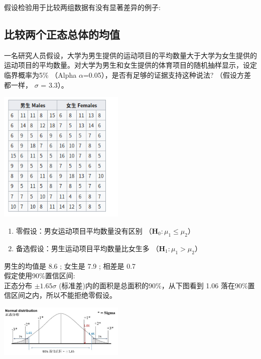 假设检验用于比较两组数据有没有显著差异的例子:

\hypertarget{ux6bd4ux8f83ux4e24ux4e2aux6b63ux6001ux603bux4f53ux7684ux5747ux503c}{%
\subsection{比较两个正态总体的均值}\label{ux6bd4ux8f83ux4e24ux4e2aux6b63ux6001ux603bux4f53ux7684ux5747ux503c}}

一名研究人员假设，大学为男生提供的运动项目的平均数量大于大学为女生提供的运动项目的平均数量。对大学为男生和女生提供的体育项目的随机抽样显示，设定临界概率为5\%
（Alpha \(\alpha\)=0.05），是否有足够的证据支持这种说法? （假设方差都一样，
\(\sigma\) = 3.3）。


\includegraphics[width=6cm]{Screenshotfrom2022-12-2822-35-57.png}


\begin{enumerate}
\tightlist
\item
  零假设：男女运动项目平均数量没有区别
  （\(\mathbf{H}_0: {\mu}_1 \le  {\mu}_2\)）
\item
  备选假设：男生运动项目平均数量比女生多
  （\(\mathbf{H}_1: {\mu}_1 > {\mu}_2\)）
\end{enumerate}

男生的均值是 8.6 ; 女生是 7.9 ; 相差是 0.7\\
假定使用90\%置信区间:\\
正态分布 \(\pm 1.65{\sigma}\) (标准差)内的面积是总面积的90\%，从下图看到
1.06 落在90\%置信区间之内，所以不能拒绝零假设。


\includegraphics[width=6cm]{M4twoPopulationScreenshot_2022-09-11_201946.jpg}

